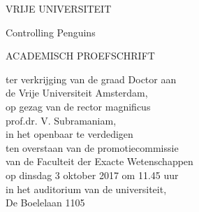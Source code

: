 \begin{titlepage}



%
%
%


%
%


\begin{center}
	VRIJE UNIVERSITEIT

	\vspace{1cm}

	Controlling Penguins

	\vspace{2cm}

	ACADEMISCH PROEFSCHRIFT

	\vspace{0.5cm}

\begin{minipage}{0.65\textwidth}
\centering
ter verkrijging van de graad Doctor aan\\
de Vrije Universiteit Amsterdam,\\
op gezag van de rector magnificus\\
prof.dr. V. Subramaniam,\\
in het openbaar te verdedigen\\
ten overstaan van de promotiecommissie\\
van de Faculteit der Exacte Wetenschappen\\
op dinsdag 3 oktober 2017 om 11.45 uur\\
in het auditorium van de universiteit,\\
De Boelelaan 1105
\end{minipage}\\[3cm]


\end{center}
\end{titlepage}
